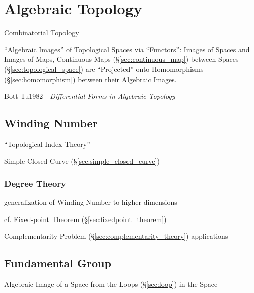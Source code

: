 \section{Algebraic Topology}\label{sec:algebraic_topology}

Combinatorial Topology

``Algebraic Images'' of Topological Spaces via ``Functors'': Images of
Spaces and Images of Maps, Continuous Maps
(\S\ref{sec:continuous_map}) between Spaces
(\S\ref{sec:topological_space}) are ``Projected'' onto Homomorphisms
(\S\ref{sec:homomorphism}) between their Algebraic
Images.\cite{hatcher02}

Bott-Tu1982 - \emph{Differential Forms in Algebraic Topology}



\subsection{Winding Number}\label{sec:winding_number}

``Topological Index Theory''

Simple Closed Curve (\S\ref{sec:simple_closed_curve})



\subsubsection{Degree Theory}\label{sec:degree_theory}

generalization of Winding Number to higher dimensions

cf. Fixed-point Theorem (\S\ref{sec:fixedpoint_theorem})

Complementarity Problem (\S\ref{sec:complementarity_theory}) applications



\subsection{Fundamental Group}\label{sec:fundamental_group}

Algebraic Image of a Space from the Loops (\S\ref{sec:loop}) in the
Space

